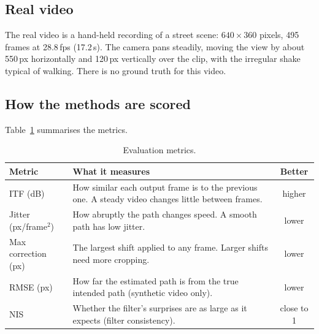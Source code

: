 \documentclass[11pt,a4paper]{article}
\begin{document}
\subsection{Real video}
The real video is a hand-held recording of a street scene: $640\times360$ pixels, 495 frames
at 28.8\,fps (17.2\,s). The camera pans steadily, moving the view by about 550\,px horizontally
and 120\,px vertically over the clip, with the irregular shake typical of walking. There is no
ground truth for this video.

\subsection{How the methods are scored}
Table~\ref{tab:metrics} summarises the metrics.

\begin{table}[htbp]
  \centering
  \small
  \caption{Evaluation metrics.}
  \label{tab:metrics}
  \begin{tabularx}{\linewidth}{@{}lXc@{}}
    \toprule
    Metric & What it measures & Better \\
    \midrule
    ITF (dB) & How similar each output frame is to the previous one. A steady video changes
               little between frames. & higher \\
    Jitter (px/frame$^2$) & How abruptly the path changes speed. A smooth path has low
                            jitter. & lower \\
    Max correction (px) & The largest shift applied to any frame. Larger shifts need more
                          cropping. & lower \\
    RMSE (px) & How far the estimated path is from the true intended path (synthetic video
                only). & lower \\
    NIS & Whether the filter's surprises are as large as it expects (filter consistency). &
          close to 1 \\
    \bottomrule
  \end{tabularx}
\end{table}
\end{document}
